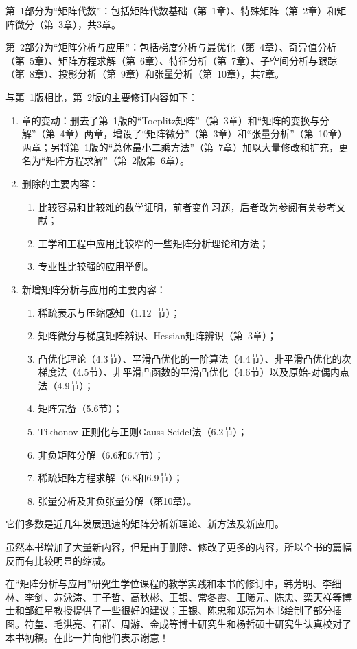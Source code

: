 \documentclass[punct=kaiming, fontset=sikou]{ctexbook}
\numberwithin{equation}{section}
\begin{document}
  第~1部分为“矩阵代数”：包括矩阵代数基础（第~1章）、特殊矩阵（第~2章）和矩阵微分（第~3章），共3章。

  第~2部分为“矩阵分析与应用”：包括梯度分析与最优化（第~4章）、奇异值分析（第~5章）、矩阵方程求解（第~6章）、特征分析（第~7章）、子空间分析与跟踪（第~8章）、投影分析（第~9章）和张量分析（第~10章），共7章。

  与第~1版相比，第~2版的主要修订内容如下：
  \begin{enumerate}
    \item 章的变动：删去了第~1版的“Toeplitz矩阵”（第~3章）和“矩阵的变换与分解”（第~4章）两章，增设了“矩阵微分”（第~3章）和“张量分析”（第~10章）两章；另将第~1版的“总体最小二乘方法”（第~7章）加以大量修改和扩充，更名为“矩阵方程求解”（第~2版第~6章）。
    \item 删除的主要内容：
    \begin{enumerate}
      \item 比较容易和比较难的数学证明，前者变作习题，后者改为参阅有关参考文献；
      \item 工学和工程中应用比较窄的一些矩阵分析理论和方法；
      \item 专业性比较强的应用举例。
    \end{enumerate}
    \item 新增矩阵分析与应用的主要内容：
    \begin{enumerate}
      \item 稀疏表示与压缩感知（1.12~节）；
      \item 矩阵微分与梯度矩阵辨识、Hessian矩阵辨识（第~3章）；
      \item 凸优化理论（4.3节）、平滑凸优化的一阶算法（4.4节）、非平滑凸优化的次梯度法（4.5节）、非平滑凸函数的平滑凸优化（4.6节）以及原始-对偶内点法（4.9节）；
      \item 矩阵完备（5.6节）；
      \item Tikhonov 正则化与正则Gauss-Seidel法（6.2节）；
      \item 非负矩阵分解（6.6和6.7节）；
      \item 稀疏矩阵方程求解（6.8和6.9节）；
      \item 张量分析及非负张量分解（第10章）。
    \end{enumerate}
  \end{enumerate}
  它们多数是近几年发展迅速的矩阵分析新理论、新方法及新应用。

  虽然本书增加了大量新内容，但是由于删除、修改了更多的内容，所以全书的篇幅反而有比较明显的缩减。

  在“矩阵分析与应用”研究生学位课程的教学实践和本书的修订中，韩芳明、李细林、李剑、苏泳涛、丁子哲、高秋彬、王银、常冬霞、王曦元、陈忠、栾天祥等博士和邹红星教授提供了一些很好的建议；王银、陈忠和郑亮为本书绘制了部分插图。符玺、毛洪亮、石群、周游、金成等博士研究生和杨哲硕士研究生认真校对了本书初稿。在此一并向他们表示谢意！
\end{document}

